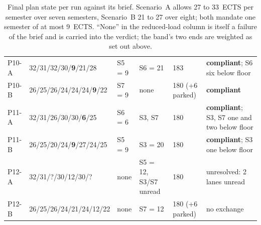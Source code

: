 \begin{table}[htpb]
\begin{tabular}{@{}l p{3.6cm} l >{\raggedright\arraybackslash}p{1.8cm} l >{\raggedright\arraybackslash}p{2.5cm}@{}}
        P10-A & 32/31/32/30/\textbf{9}/21/28 & S5 = 9 & S6 = 21 & 183 & \textbf{compliant}; S6 six below floor \\
        P10-B & 26/25/26/24/24/24/\textbf{9}/22 & S7 = 9 & none & 180 (+6 parked) & \textbf{compliant} \\
        P11-A & 32/31/26/30/30/\textbf{6}/25 & S6 = 6 & S3, S7 & 180 & \textbf{compliant}; S3, S7 one and two below floor \\
        P11-B & 26/25/20/24/\textbf{9}/27/24/25 & S5 = 9 & S3 = 20 & 180 & \textbf{compliant}; S3 one below floor \\
        P12-A & 32/31/?/30/12/30/? & none & S5 = 12, S3/S7 unread & 180 & unresolved: 2 lanes unread \\
        P12-B & 26/25/26/24/21/24/12/22 & none & S7 = 12 & 180 (+6 parked) & no exchange \\
        \bottomrule
    \end{tabular}
    \caption{Final plan state per run against its brief. Scenario~A allows 27 to 33~ECTS per semester over seven semesters, Scenario~B 21 to 27 over eight; both mandate one semester of at most 9~ECTS. \enquote{None} in the reduced-load column is itself a failure of the brief and is carried into the verdict; the band's two ends are weighted as set out above.}
    \label{tab:app-completion}
\end{table}
